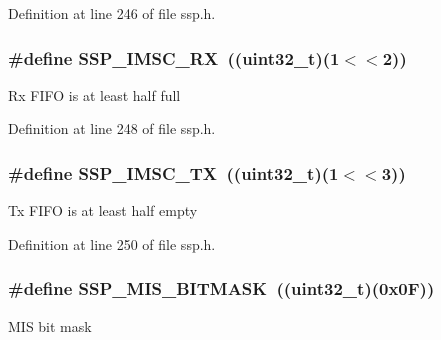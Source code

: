 Definition at line 246 of file ssp.\+h.

\subsubsection[{\texorpdfstring{S\+S\+P\+\_\+\+I\+M\+S\+C\+\_\+\+RX}{SSP_IMSC_RX}}]{\setlength{\rightskip}{0pt plus 5cm}\#define S\+S\+P\+\_\+\+I\+M\+S\+C\+\_\+\+RX~(({\bf uint32\+\_\+t})(1$<$$<$2))}\hypertarget{group___s_s_p___private___macros_ga9f4d1fa05f49655cc6e5548b11dfe092}{}\label{group___s_s_p___private___macros_ga9f4d1fa05f49655cc6e5548b11dfe092}
Rx F\+I\+FO is at least half full 

Definition at line 248 of file ssp.\+h.

\subsubsection[{\texorpdfstring{S\+S\+P\+\_\+\+I\+M\+S\+C\+\_\+\+TX}{SSP_IMSC_TX}}]{\setlength{\rightskip}{0pt plus 5cm}\#define S\+S\+P\+\_\+\+I\+M\+S\+C\+\_\+\+TX~(({\bf uint32\+\_\+t})(1$<$$<$3))}\hypertarget{group___s_s_p___private___macros_ga0e1c817c6d276a0fd17b0c4d21668818}{}\label{group___s_s_p___private___macros_ga0e1c817c6d276a0fd17b0c4d21668818}
Tx F\+I\+FO is at least half empty 

Definition at line 250 of file ssp.\+h.

\subsubsection[{\texorpdfstring{S\+S\+P\+\_\+\+M\+I\+S\+\_\+\+B\+I\+T\+M\+A\+SK}{SSP_MIS_BITMASK}}]{\setlength{\rightskip}{0pt plus 5cm}\#define S\+S\+P\+\_\+\+M\+I\+S\+\_\+\+B\+I\+T\+M\+A\+SK~(({\bf uint32\+\_\+t})(0x0\+F))}\hypertarget{group___s_s_p___private___macros_ga9571d63a5315c056b7a54e2f4736c1d7}{}\label{group___s_s_p___private___macros_ga9571d63a5315c056b7a54e2f4736c1d7}
M\+IS bit mask 

